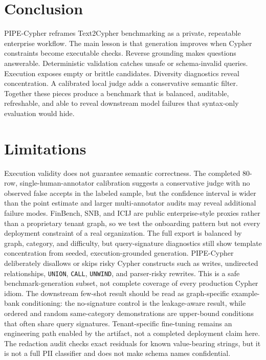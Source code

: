 \documentclass[11pt]{article}
\begin{document}
\section{Conclusion}
PIPE-Cypher reframes Text2Cypher benchmarking as a private, repeatable enterprise workflow. The main lesson is that generation improves when Cypher constraints become executable checks. Reverse grounding makes questions answerable. Deterministic validation catches unsafe or schema-invalid queries. Execution exposes empty or brittle candidates. Diversity diagnostics reveal concentration. A calibrated local judge adds a conservative semantic filter. Together these pieces produce a benchmark that is balanced, auditable, refreshable, and able to reveal downstream model failures that syntax-only evaluation would hide.

\section*{Limitations}
Execution validity does not guarantee semantic correctness. The completed 80-row, single-human-annotator calibration suggests a conservative judge with no observed false accepts in the labeled sample, but the confidence interval is wider than the point estimate and larger multi-annotator audits may reveal additional failure modes. FinBench, SNB, and ICIJ are public enterprise-style proxies rather than a proprietary tenant graph, so we test the onboarding pattern but not every deployment constraint of a real organization. The full export is balanced by graph, category, and difficulty, but query-signature diagnostics still show template concentration from seeded, execution-grounded generation. PIPE-Cypher deliberately disallows or skips risky Cypher constructs such as writes, undirected relationships, \texttt{UNION}, \texttt{CALL}, \texttt{UNWIND}, and parser-risky rewrites. This is a safe benchmark-generation subset, not complete coverage of every production Cypher idiom. The downstream few-shot result should be read as graph-specific example-bank conditioning: the no-signature control is the leakage-aware result, while ordered and random same-category demonstrations are upper-bound conditions that often share query signatures. Tenant-specific fine-tuning remains an engineering path enabled by the artifact, not a completed deployment claim here. The redaction audit checks exact residuals for known value-bearing strings, but it is not a full PII classifier and does not make schema names confidential.
\end{document}

